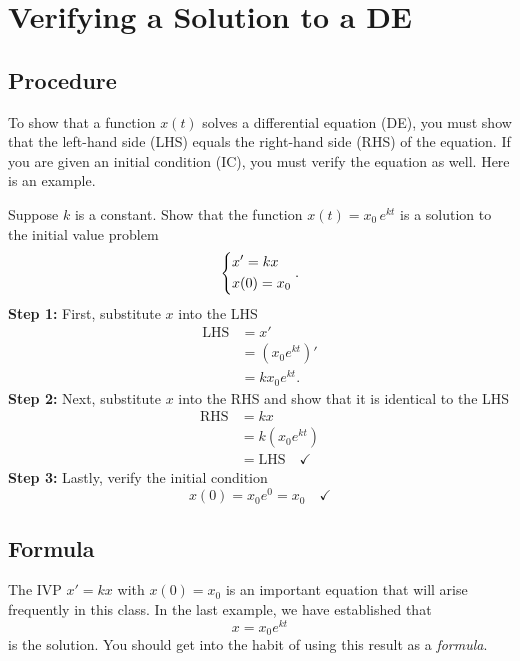 \documentclass[10pt,letterpaper]{article}
\begin{document}



\section{Verifying a Solution to a DE}

\subsection{Procedure}
To show that a function $x(t)$ solves a differential equation (DE), you must show that the left-hand side (LHS) equals the right-hand side (RHS) of the equation. If you are given an initial condition (IC), you must verify the equation as well. Here is an example.

\begin{example}[1]{
Suppose $k$ is a constant. Show that the function $x(t) = x_0 \,e^{kt}$ is a solution to the initial value problem
$$
\begin{dcases}
    x'=kx\\
    x(0)=x_0
\end{dcases}.
$$
}
\textbf{Step 1:} First, substitute $x$ into the LHS 
\begin{align*}
    \text{LHS} &= x'\\
            &=( x_0e^{kt})'\\
            &=k x_0e^{kt}.
\end{align*}
\textbf{Step 2:} Next, substitute $x$ into the RHS and show that it is identical to the LHS
\begin{align*}
    \text{RHS} &= kx\\ 
               &= k( x_0e^{kt})\\
               &= \text{LHS}\quad \checkmark
\end{align*}
\textbf{Step 3:} Lastly, verify the initial condition  
$$
x(0) = x_0 e^{0}=x_0\quad \checkmark 
$$
\end{example}

\subsection{Formula}
The IVP $x'=kx$ with $x(0)=x_0$ is an important equation that will arise frequently in this class. In the last example, we have established that 
$$
    x = x_0e^{kt}
$$
is the solution. You should get into the habit of using this result as a \textit{formula}. 
\end{document}
